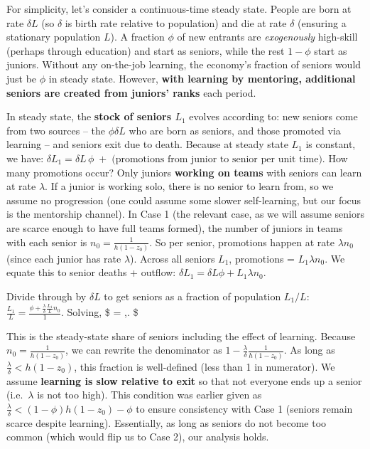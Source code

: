 \documentclass[12pt]{article}
\begin{document}
For simplicity, let's consider a continuous-time steady state. People
are born at rate \(\delta L\) (so \(\delta\) is birth rate relative to
population) and die at rate \(\delta\) (ensuring a stationary population
\(L\)). A fraction \(\phi\) of new entrants are \emph{exogenously}
high-skill (perhaps through education) and start as seniors, while the
rest \(1-\phi\) start as juniors. Without any on-the-job learning, the
economy's fraction of seniors would just be \(\phi\) in steady state.
However, \textbf{with learning by mentoring, additional seniors are
created from juniors' ranks} each period.

In steady state, the \textbf{stock of seniors \(L_1\)} evolves according
to: new seniors come from two sources -- the \(\phi \delta L\) who are
born as seniors, and those promoted via learning -- and seniors exit due
to death. Because at steady state \(L_1\) is constant, we have:
\(\delta L_1 = \delta L\,\phi \;+\; \text{(promotions from junior to senior per unit time)}.\)
How many promotions occur? Only juniors \textbf{working on teams} with
seniors can learn at rate \(\lambda\). If a junior is working solo,
there is no senior to learn from, so we assume no progression (one could
assume some slower self-learning, but our focus is the mentorship
channel). In Case 1 (the relevant case, as we will assume seniors are
scarce enough to have full teams formed), the number of juniors in teams
with each senior is \(n_0 = \frac{1}{h(1-z_0)}\). So per senior,
promotions happen at rate \(\lambda n_0\) (since each junior has rate
\(\lambda\)). Across all seniors \(L_1\), promotions =
\(L_1 \lambda n_0\). We equate this to senior deaths + outflow:
\(\delta L_1 = \delta L \phi + L_1 \lambda n_0.\)

Divide through by \(\delta L\) to get seniors as a fraction of
population \(L_1/L\):
\(\frac{L_1}{L} = \frac{\phi + \frac{\lambda}{\delta} \frac{L_1}{L} n_0}{1}.\)
Solving, \$  =
,. \$

This is the steady-state share of seniors including the effect of
learning. Because \(n_0 = \frac{1}{h(1-z_0)}\), we can rewrite the
denominator as \(1 - \frac{\lambda}{\delta}\frac{1}{h(1-z_0)}\). As long
as \(\frac{\lambda}{\delta} < h(1-z_0)\), this fraction is well-defined
(less than 1 in numerator). We assume \textbf{learning is slow relative
to exit} so that not everyone ends up a senior (i.e.~\(\lambda\) is not
too high). This condition was earlier given as
\(\frac{\lambda}{\delta} < (1-\phi)h(1-z_0) - \phi\) to ensure
consistency with Case 1 (seniors remain scarce despite learning).
Essentially, as long as seniors do not become too common (which would
flip us to Case 2), our analysis holds.
\end{document}
